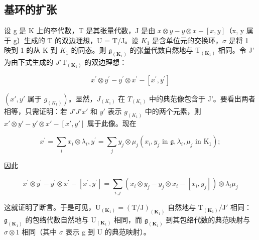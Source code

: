 \subsection{基环的扩张}

设 g 是 K 上的李代数，T 是其张量代数，J 是由 \(x \otimes y - y \otimes x - [x, y]\)（x, y 属于 g）生成的 T 的双边理想，U = T/J。设 \(K_{1}\) 是含单位元的交换环，\(\sigma\) 是将 1 映到 1 的从 K 到 \(K_{1}\) 的同态。则 \(\mathfrak{g}_{(\mathbf{K}_{1})}\) 的张量代数自然地与 \(\mathrm{T}_{(\mathbf{K}_{1})}\) 相同。令 J' 为由下式生成的 \(J'\)\(\mathrm{T}_{(\mathbf{K}_{1})}\) 的双边理想：

\[
x ^ {\prime} \otimes y ^ {\prime} - y ^ {\prime} \otimes x ^ {\prime} - [ x ^ {\prime}, y ^ {\prime} ]
\]

\((x', y' \text{ 属于 } g_{(K_1)})\)。显然，\(J_{(K_1)}\) 在 \(T_{(K_1)}\) 中的典范像包含于 J'。要看出两者相等，只需证明：若 \(J'\)\(J'\)\(x'\) 和 \(y'\) 表示 \(g_{(K_1)}\) 中的两个元素，则 \(x' \otimes y' - y' \otimes x' - [x', y']\) 属于此像。现在

\[
x ^ {\prime} = \sum_ {i} x _ {i} \otimes \lambda_ {i}, y ^ {\prime} = \sum_ {j} y _ {j} \otimes \mu_ {j} (x _ {i}, y _ {j} \text {   in   } \mathfrak {g}, \lambda_ {i}, \mu_ {j} \text {   in   } \mathrm{K} _ {1});
\]

因此

\[
x ^ {\prime} \otimes y ^ {\prime} - y ^ {\prime} \otimes x ^ {\prime} - [ x ^ {\prime}, y ^ {\prime} ] = \sum_ {i, j} (x _ {i} \otimes y _ {j} - y _ {j} \otimes x _ {i} - [ x _ {i}, y _ {j} ]) \otimes \lambda_ {i} \mu_ {j}
\]

这就证明了断言。于是可见，\(\mathrm{U}_{(\mathbf{K}_{1})} = (\mathrm{T}/\mathrm{J})_{(\mathbf{K}_{1})}\) 自然地与 \(\mathrm{T}_{(\mathbf{K}_{1})}/\mathrm{J}'\) 相同：\(\mathfrak{g}_{(\mathbf{K}_{1})}\) 的包络代数自然地与 \(\mathrm{U}_{(\mathbf{K}_{1})}\) 相同，而 \(\mathfrak{g}_{(\mathbf{K}_{1})}\) 到其包络代数的典范映射与 \(\sigma \otimes 1\) 相同（其中 \(\sigma\) 表示 g 到 U 的典范映射）。

